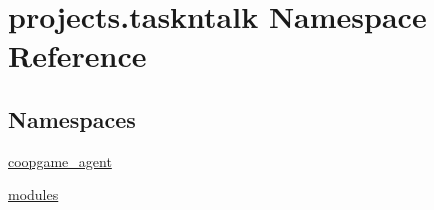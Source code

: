 \hypertarget{namespaceprojects_1_1taskntalk}{}\section{projects.\+taskntalk Namespace Reference}
\label{namespaceprojects_1_1taskntalk}
\subsection*{Namespaces}
\begin{DoxyCompactItemize}
\item 
 \hyperlink{namespaceprojects_1_1taskntalk_1_1coopgame__agent}{coopgame\+\_\+agent}
\item 
 \hyperlink{namespaceprojects_1_1taskntalk_1_1modules}{modules}
\end{DoxyCompactItemize}
